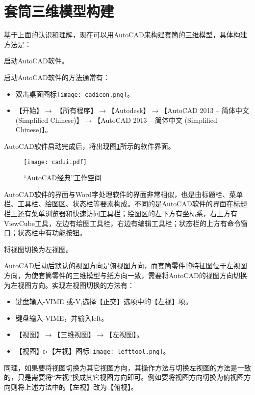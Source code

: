 \section{套筒三维模型构建}
基于上面的认识和理解，现在可以用AutoCAD来构建套筒的三维模型，具体构建方法是：
\begin{procedure}

\item 启动AutoCAD软件。

启动AutoCAD软件的方法通常有：
\begin{itemize}
\item 双击桌面图标\texttt{[image: cadicon.png]}。
\item 【开始】$\rightarrow$ 【所有程序】$\rightarrow$【Autodesk】$\rightarrow$【AutoCAD 2013 – 简体中文 (Simplified Chinese)】$\rightarrow$【AutoCAD 2013 – 简体中文 (Simplified Chinese)】。
\end{itemize}
AutoCAD软件启动完成后，将出现图\ref{fig:cadui}所示的软件界面。
\begin{figure}[htbp]
\centering
\texttt{[image: cadui.pdf]}
\caption{“AutoCAD经典”工作空间}\label{fig:cadui}
\end{figure}
AutoCAD软件的界面与Word字处理软件的界面非常相似，也是由标题栏、菜单栏、工具栏、绘图区、状态栏等要素构成。不同的是AutoCAD软件的界面在标题栏上还有菜单浏览器和快速访问工具栏；绘图区的左下方有坐标系，右上方有ViewCube工具，左边有绘图工具栏，右边有编辑工具栏；状态栏的上方有命令窗口；状态栏中有功能按钮。

\item 将视图切换为左视图。

AutoCAD启动后默认的视图方向是俯视图方向，而套筒零件的特征图位于左视图方向，为使套筒零件的三维模型与纸方向一致，需要将AutoCAD的视图方向切换为左视图方向。实现左视图切换的方法有：
\begin{itemize}
\item 键盘输入-VIME 或-V,选择【正交】选项中的【左视】项。
\item 键盘输入-VIME，并输入left。
\item 【视图】$\rightarrow$【三维视图】$\rightarrow$【左视图】。
\item 【视图】$\triangleright$【左视】图标\texttt{[image: lefttool.png]}。
\end{itemize}
同理，如果要将视图切换为其它视图方向，其操作方法与切换左视图的方法是一致的，只是需要将“左视”换成其它视图方向即可。例如要将视图方向切换为俯视图方向则将上述方法中的【左视】改为【俯视】。


\end{procedure}
